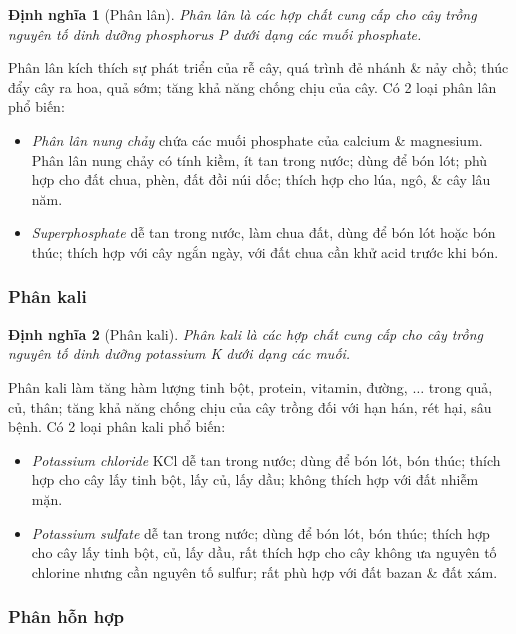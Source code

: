 \documentclass{article}
\newtheorem{dinhnghia}{Định nghĩa}
\begin{document}
\begin{dinhnghia}[Phân lân]
	\emph{Phân lân} là các hợp chất cung cấp cho cây trồng nguyên tố dinh dưỡng phosphorus \emph{P} dưới dạng các muối phosphate.
\end{dinhnghia}
Phân lân kích thích sự phát triển của rễ cây, quá trình đẻ nhánh \& nảy chồ; thúc đẩy cây ra hoa, quả sớm; tăng khả năng chống chịu của cây. Có 2 loại phân lân phổ biến:
\begin{itemize}
	\item \textit{Phân lân nung chảy} chứa các muối phosphate của calcium \& magnesium. Phân lân nung chảy có tính kiềm, ít tan trong nước; dùng để bón lót; phù hợp cho đất chua, phèn, đất đồi núi dốc; thích hợp cho lúa, ngô, \& cây lâu năm.
	\item \textit{Superphosphate}  dễ tan trong nước, làm chua đất, dùng để bón lót hoặc bón thúc; thích hợp với cây ngắn ngày, với đất chua cần khử acid trước khi bón.
\end{itemize}

\subsubsection{Phân kali}

\begin{dinhnghia}[Phân kali]
	\emph{Phân kali} là các hợp chất cung cấp cho cây trồng nguyên tố dinh dưỡng potassium \emph{K} dưới dạng các muối.
\end{dinhnghia}
Phân kali làm tăng hàm lượng tinh bột, protein, vitamin, đường, $\ldots$ trong quả, củ, thân; tăng khả năng chống chịu của cây trồng đối với hạn hán, rét hại, sâu bệnh. Có 2 loại phân kali phổ biến:
\begin{itemize}
	\item \textit{Potassium chloride} KCl dễ tan trong nước; dùng để bón lót, bón thúc; thích hợp cho cây lấy tinh bột, lấy củ, lấy dầu; không thích hợp với đất nhiễm mặn.
	\item \textit{Potassium sulfate}  dễ tan trong nước; dùng để bón lót, bón thúc; thích hợp cho cây lấy tinh bột, củ, lấy dầu, rất thích hợp cho cây không ưa nguyên tố chlorine nhưng cần nguyên tố sulfur; rất phù hợp với đất bazan \& đất xám.
\end{itemize}

\subsubsection{Phân hỗn hợp}
\end{document}
